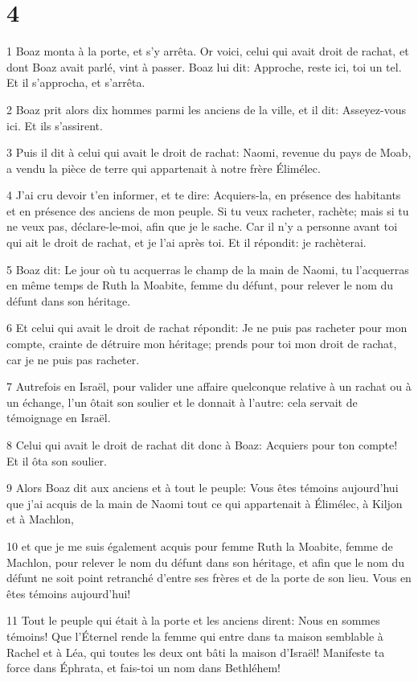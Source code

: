 \chapter{4}

\par 1 Boaz monta à la porte, et s'y arrêta. Or voici, celui qui avait droit de rachat, et dont Boaz avait parlé, vint à passer. Boaz lui dit: Approche, reste ici, toi un tel. Et il s'approcha, et s'arrêta.
\par 2 Boaz prit alors dix hommes parmi les anciens de la ville, et il dit: Asseyez-vous ici. Et ils s'assirent.
\par 3 Puis il dit à celui qui avait le droit de rachat: Naomi, revenue du pays de Moab, a vendu la pièce de terre qui appartenait à notre frère Élimélec.
\par 4 J'ai cru devoir t'en informer, et te dire: Acquiers-la, en présence des habitants et en présence des anciens de mon peuple. Si tu veux racheter, rachète; mais si tu ne veux pas, déclare-le-moi, afin que je le sache. Car il n'y a personne avant toi qui ait le droit de rachat, et je l'ai après toi. Et il répondit: je rachèterai.
\par 5 Boaz dit: Le jour où tu acquerras le champ de la main de Naomi, tu l'acquerras en même temps de Ruth la Moabite, femme du défunt, pour relever le nom du défunt dans son héritage.
\par 6 Et celui qui avait le droit de rachat répondit: Je ne puis pas racheter pour mon compte, crainte de détruire mon héritage; prends pour toi mon droit de rachat, car je ne puis pas racheter.
\par 7 Autrefois en Israël, pour valider une affaire quelconque relative à un rachat ou à un échange, l'un ôtait son soulier et le donnait à l'autre: cela servait de témoignage en Israël.
\par 8 Celui qui avait le droit de rachat dit donc à Boaz: Acquiers pour ton compte! Et il ôta son soulier.
\par 9 Alors Boaz dit aux anciens et à tout le peuple: Vous êtes témoins aujourd'hui que j'ai acquis de la main de Naomi tout ce qui appartenait à Élimélec, à Kiljon et à Machlon,
\par 10 et que je me suis également acquis pour femme Ruth la Moabite, femme de Machlon, pour relever le nom du défunt dans son héritage, et afin que le nom du défunt ne soit point retranché d'entre ses frères et de la porte de son lieu. Vous en êtes témoins aujourd'hui!
\par 11 Tout le peuple qui était à la porte et les anciens dirent: Nous en sommes témoins! Que l'Éternel rende la femme qui entre dans ta maison semblable à Rachel et à Léa, qui toutes les deux ont bâti la maison d'Israël! Manifeste ta force dans Éphrata, et fais-toi un nom dans Bethléhem!
